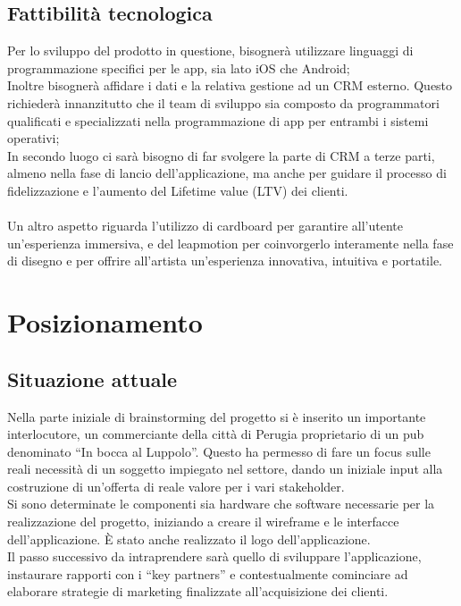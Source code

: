 \documentclass[11pt,fleqn]{book} %
\begin{document}
\section{Fattibilità tecnologica}
Per lo sviluppo del prodotto in questione, bisognerà utilizzare linguaggi di programmazione specifici per le app, sia lato iOS che Android;\\ Inoltre bisognerà affidare i dati e la relativa gestione ad un CRM esterno. Questo richiederà innanzitutto che il team di sviluppo sia composto da programmatori qualificati e specializzati nella programmazione di app per entrambi i sistemi operativi;\\
In secondo luogo ci sarà bisogno di far svolgere la parte di CRM a terze parti, almeno nella fase di lancio dell’applicazione, ma anche per guidare il processo di fidelizzazione e l'aumento del Lifetime value (LTV) dei clienti.\\\\
Un altro aspetto riguarda l'utilizzo di cardboard per garantire all'utente un'esperienza immersiva, e del leapmotion per coinvorgerlo interamente nella fase di disegno e per offrire all'artista un'esperienza innovativa, intuitiva e portatile.\\







\chapter{Posizionamento}

\section{Situazione attuale}
Nella parte iniziale di brainstorming del progetto si è inserito un importante interlocutore,
un commerciante della città di Perugia proprietario di un pub denominato “In bocca al
Luppolo”. Questo ha permesso di fare un focus sulle reali necessità di un soggetto
impiegato nel settore, dando un iniziale input alla costruzione di un’offerta di reale valore
per i vari stakeholder. 
\\Si sono determinate le componenti sia hardware che software necessarie per la realizzazione del progetto, iniziando a creare il wireframe e le interfacce dell’applicazione. È stato anche realizzato il logo dell’applicazione.\\
Il passo successivo da intraprendere sarà quello di sviluppare l’applicazione, instaurare
rapporti con i “key partners” e contestualmente cominciare ad elaborare strategie di
marketing finalizzate all’acquisizione dei clienti.
\\
\end{document}
